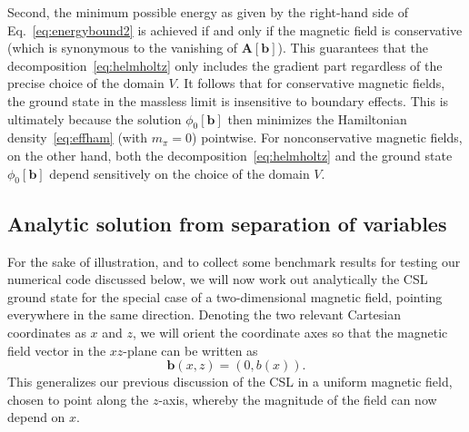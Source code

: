 \documentclass[pdflatex,iicol,sn-mathphys-num]{sn-jnl}
\let\p=\phi
\newcommand{\vek}[1]{\bm{#1}}%
\newcommand{\bmag}{b}%
\begin{document}
Second, the minimum possible energy as given by the right-hand side of Eq.~\eqref{eq:energybound2} is achieved if and only if the magnetic field is conservative (which is synonymous to the vanishing of $\vek A[\vek\bmag]$). This guarantees that the decomposition~\eqref{eq:helmholtz} only includes the gradient part regardless of the precise choice of the domain $V$. It follows that for conservative magnetic fields, the ground state in the massless limit is insensitive to boundary effects. This is ultimately because the solution $\p_0[\vek\bmag]$ then minimizes the Hamiltonian density~\eqref{eq:effham} (with $m_\pi=0$) pointwise. For nonconservative magnetic fields, on the other hand, both the decomposition~\eqref{eq:helmholtz} and the ground state $\p_0[\vek\bmag]$ depend sensitively on the choice of the domain $V$.


\subsection{Analytic solution from separation of variables}
\label{subsec:nonuniformBzeroMseparation}

For the sake of illustration, and to collect some benchmark results for testing our numerical code discussed below, we will now work out analytically the CSL ground state for the special case of a two-dimensional magnetic field, pointing everywhere in the same direction. Denoting the two relevant Cartesian coordinates as $x$ and $z$, we will orient the coordinate axes so that the magnetic field vector in the $xz$-plane can be written as
\begin{equation}
\vek\bmag(x,z)=(0,\bmag(x)).
\label{eq:2d_straightH}
\end{equation}
This generalizes our previous discussion of the CSL in a uniform magnetic field, chosen to point along the $z$-axis, whereby the magnitude of the field can now depend on $x$.
\end{document}

